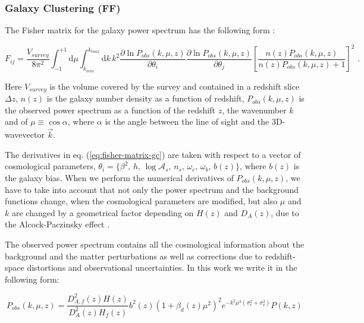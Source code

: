\subsubsection{Galaxy Clustering (FF)}

The Fisher matrix for the galaxy power spectrum has the following
form \citep{seo2007improved, amendola2012testing}:

\begin{equation}
F_{ij}=\frac{V_{survey}}{8\pi^{2}}\int_{-1}^{+1}\mbox{d}\mu\int_{k_{min}}^{k_{max}}\mbox{d}k\, k^{2}\frac{\partial\ln P_{obs}(k,\mu,z)}{\partial\theta_{i}}\frac{\partial\ln P_{obs}(k,\mu,z)}{\partial\theta_{j}}\left[\frac{n(z)P_{obs}(k,\mu,z)}{n(z)P_{obs}(k,\mu,z)+1}\right]^{2}\,\,.\label{eq:fisher-matrix-gc}
\end{equation}


Here $V_{survey}$ is the volume covered by the survey and contained
in a redshift slice $\Delta z$, $n(z)$ is the galaxy number density
as a function of redshift, $P_{obs}(k,\mu,z)$ is the observed power
spectrum as a function of the redshift $z$, the wavenumber $k$ and
of $\mu\equiv\cos\alpha$, where $\alpha$ is the angle between the
line of sight and the 3D-wavevector $\vec{k}$.

The derivatives in eq. (\ref{eq:fisher-matrix-gc}) are taken with
respect to a vector of cosmological parameters, $\theta_{i}=\{\beta^{2},\, h,\,\log\mathcal{A}_{s},\, n_{s},\,\omega_{c},\,\omega_{b},\, b(z)\}$,
where $b(z)$ is the galaxy bias. When we perform the numerical derivatives
of $P_{obs}(k,\mu,z)$, we have to take into account that not only
the power spectrum and the background functions change, when the cosmological
parameters are modified, but also $\mu$ and $k$ are changed by a
geometrical factor depending on $H(z)$ and $D_{A}(z)$, due to the
Alcock-Paczinsky effect \citep{alcock1979anevolution}.

The observed power spectrum contains all the cosmological information
about the background and the matter perturbations as well as corrections
due to redshift-space distortions and observational uncertainties.
In this work we write it in the following form:

\begin{equation}
P_{obs}(k,\mu,z)=\frac{D_{A,f}^{2}(z)H(z)}{D_{A}^{2}(z)H_{f}(z)}b^{2}(z)(1+\beta_{d}(z)\mu^{2})^{2}e^{-k^{2}\mu^{2}(\sigma_{r}^{2}+\sigma_{v}^{2})}P(k,z)\label{eq:observed-Pk}
\end{equation}


